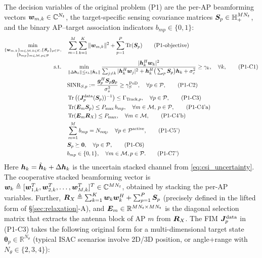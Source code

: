 The decision variables of the original problem (P1) are the per-AP beamforming vectors $\bm{w}_{m,k} \in \mathbb{C}^{N_t}$, the target-specific sensing covariance matrices $\bm{S}_p\in\mathbb{H}_+^{MN_t}$, and the binary AP--target association indicators $b_{mp}\in\{0,1\}$:
\begin{align}
\min_{\substack{\{\bm{w}_{m,k}\}_{m \in \mathcal{M}, k \in \mathcal{K}}, \{\bm{S}_p\}_{p \in \mathcal{P}}, \\ \{b_{mp}\}_{m \in \mathcal{M}, p \in \mathcal{P}}}} \quad
& \sum_{m=1}^{M} \sum_{k=1}^{K} \|\bm{w}_{m,k}\|^2 + \sum_{p=1}^{P} \operatorname{Tr}(\bm{S}_p) \tag{P1-objective} \\
\text{s.t.} \quad
& \min_{\|\Delta\bm{h}_k\| \leq \epsilon_h \|\hat{\bm{h}}_k\|}
  \frac{|\bm{h}_k^H \bm{w}_k|^2}
  {\sum_{j \neq k} |\bm{h}_k^H \bm{w}_j|^2
   + \bm{h}_k^H \big(\textstyle\sum_p \bm{S}_p\big) \bm{h}_k
   + \sigma_c^2}
  \geq \gamma_k, \quad \forall k, \tag{P1-C1} \\
& \text{SINR}_{S,p} := \frac{\bm{g}_p^H \bm{S}_p \bm{g}_p}{\sigma_s^2} \geq \gamma_S^{\text{PoD}}, \quad \forall p \in \mathcal{P}, \tag{P1-C2} \\
& \operatorname{Tr}\big((\bm{J}_p^{\text{data}}(\bm{S}_p))^{-1}\big) \leq \Gamma_{\text{Track}, p}, \quad \forall p \in \mathcal{P}, \tag{P1-C3} \\
& \operatorname{Tr}(\bm{E}_m \bm{S}_p) \leq P_{\max} \, b_{mp}, \quad \forall m \in \mathcal{M}, \, p \in \mathcal{P}, \tag{P1-C4'a} \label{eq:p1c4a} \\
& \operatorname{Tr}(\bm{E}_m \bm{R}_X) \leq P_{\max}, \quad \forall m \in \mathcal{M}, \tag{P1-C4'b} \label{eq:p1c4b} \\
& \sum_{m=1}^{M} b_{mp} = N_{\text{req}}, \quad \forall p \in \mathcal{P}^{\text{active}}, \tag{P1-C5'} \\
& \bm{S}_p \succeq \bm{0}, \quad \forall p \in \mathcal{P}, \tag{P1-C6} \\
& b_{mp}\in\{0,1\}, \quad \forall m \in \mathcal{M}, p \in \mathcal{P}. \tag{P1-C7'}
\end{align}
Here $\bm{h}_k=\hat{\bm{h}}_k+\Delta\bm{h}_k$ is the uncertain stacked channel from \eqref{eq:csi_uncertainty}. The cooperative stacked beamforming vector is $\bm{w}_k \triangleq [\bm{w}_{1,k}^T, \bm{w}_{2,k}^T, \ldots, \bm{w}_{M,k}^T]^T \in \mathbb{C}^{MN_t}$, obtained by stacking the per-AP variables. Further, $\bm{R}_X \triangleq \sum_{k=1}^{K} \bm{w}_k \bm{w}_k^H + \sum_{p=1}^{P} \bm{S}_p$ (precisely defined in the lifted form of \S\ref{sec:relaxation}-A), and $\bm{E}_m \in \mathbb{R}^{MN_t \times MN_t}$ is the diagonal selection matrix that extracts the antenna block of AP $m$ from $\bm{R}_X$. The FIM $\bm{J}_p^{\text{data}}$ in (P1-C3) takes the following original form for a multi-dimensional target state $\boldsymbol{\theta}_p \in \mathbb{R}^{N_\theta}$ (typical ISAC scenarios involve 2D/3D position, or angle+range with $N_\theta \in \{2, 3, 4\}$):
